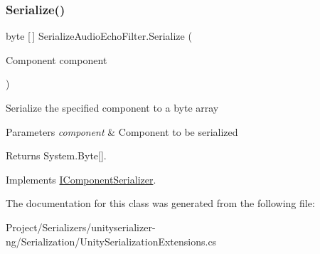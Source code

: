 \subsubsection{\texorpdfstring{Serialize()}{Serialize()}}
{\footnotesize\ttfamily byte \mbox{[}$\,$\mbox{]} Serialize\+Audio\+Echo\+Filter.\+Serialize (\begin{DoxyParamCaption}\item[{Component}]{component }\end{DoxyParamCaption})\hspace{0.3cm}{\ttfamily [inline]}}



Serialize the specified component to a byte array 


\begin{DoxyParams}{Parameters}
{\em component} & Component to be serialized\\
\hline
\end{DoxyParams}
\begin{DoxyReturn}{Returns}
System.\+Byte\mbox{[}\mbox{]}.
\end{DoxyReturn}


Implements \hyperlink{interface_i_component_serializer_ab2aa38005665496b62d6c54b5f0dbd31}{I\+Component\+Serializer}.



The documentation for this class was generated from the following file\+:\begin{DoxyCompactItemize}
\item 
Project/\+Serializers/unityserializer-\/ng/\+Serialization/Unity\+Serialization\+Extensions.\+cs\end{DoxyCompactItemize}
